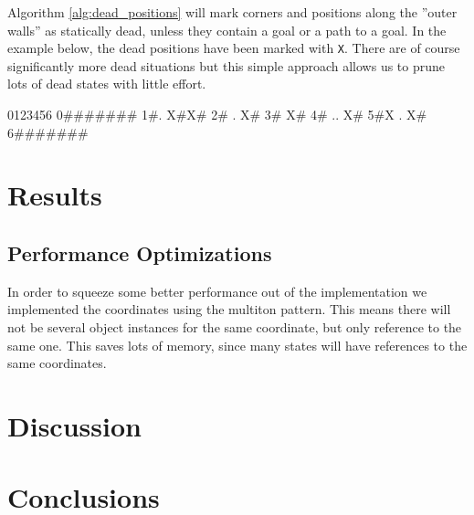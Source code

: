\documentclass[a4paper,11pt]{article}
\begin{document}
Algorithm \ref{alg:dead_positions} will mark corners and positions along the
''outer walls'' as statically dead, unless they contain a goal or a path to a goal.
In the example below, the dead positions have been marked with \verb!X!.
There are of course significantly more dead situations but this simple approach 
allows us to prune lots of dead states with little effort.

\begin{verbatimtab}
 0123456
0#######
1#. X#X#
2# .  X#
3#    X#
4# .. X#
5#X . X#
6#######

\end{verbatimtab}

\section{Results}

\subsection{Performance Optimizations}

In order to squeeze some better performance out of the implementation we implemented
the coordinates using the multiton pattern.
This means there will not be several object instances for the same coordinate,
but only reference to the same one.
This saves lots of memory, since many states will have references to the same coordinates.

\section{Discussion}

\section{Conclusions}
\end{document}
